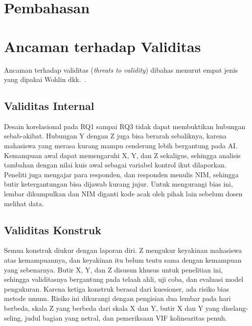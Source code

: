 \section{Pembahasan}
\label{sec:b16-pembahasan}




\section{Ancaman terhadap Validitas}
\label{sec:b16-validitas}

Ancaman terhadap validitas (\textit{threats to validity}) dibahas menurut empat jenis yang dipakai Wohlin dkk.~\cite{wohlin2012}.

\subsection{Validitas Internal}

Desain korelasional pada RQ1 sampai RQ3 tidak dapat membuktikan hubungan sebab-akibat. Hubungan Y dengan Z juga bisa berarah sebaliknya, karena mahasiswa yang merasa kurang mampu cenderung lebih bergantung pada AI. Kemampuan awal dapat memengaruhi X, Y, dan Z sekaligus, sehingga analisis tambahan dengan nilai kuis awal sebagai variabel kontrol ikut dilaporkan. Peneliti juga mengajar para responden, dan responden menulis NIM, sehingga butir ketergantungan bisa dijawab kurang jujur. Untuk mengurangi bias ini, lembar dikumpulkan dan NIM diganti kode acak oleh pihak lain sebelum dosen melihat data.

\subsection{Validitas Konstruk}

Semua konstruk diukur dengan laporan diri. Z mengukur keyakinan mahasiswa atas kemampuannya, dan keyakinan itu belum tentu sama dengan kemampuan yang sebenarnya. Butir X, Y, dan Z disusun khusus untuk penelitian ini, sehingga validitasnya bergantung pada telaah ahli, uji coba, dan evaluasi model pengukuran. Karena ketiga konstruk berasal dari kuesioner, ada risiko bias metode umum. Risiko ini dikurangi dengan pengisian dua lembar pada hari berbeda, skala Z yang berbeda dari skala X dan Y, butir X dan Y yang diselang-seling, judul bagian yang netral, dan pemeriksaan VIF kolinearitas penuh.


